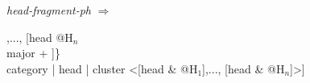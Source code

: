 \documentclass{standalone}
\begin{document}
\textit{head-fragment-ph} $\Rightarrow$
\begin{avm}
[context | sal-utt \{[head @{H$_1$} \\ major + ],..., [head @{H$_n$} \\ major + ]\} \\
category | head | cluster <[head & @{H$_1$}],..., [head & @{H$_n$}]>]
\end{avm}
\end{document}
